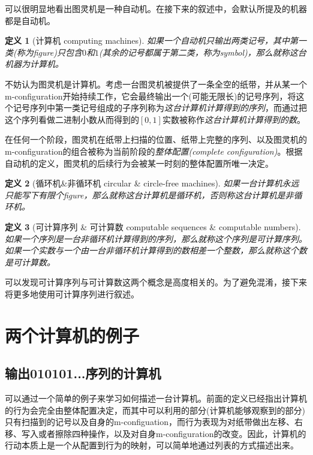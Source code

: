 \documentclass[8pt]{article}
\newtheorem{definition}{定义}
\begin{document}
可以很明显地看出图灵机是一种自动机。在接下来的叙述中，会默认所提及的机器都是自动机。

\begin{definition}[计算机 computing machines]
	如果一个自动机只输出两类记号，其中第一类(称为figure)只包含$0$和$1$(其余的记号都属于第二类，称为symbol)，那么就称这台机器为计算机。
\end{definition}

不妨认为图灵机是计算机。考虑一台图灵机被提供了一条全空的纸带，并从某一个m-configuration开始持续工作，它会最终输出一个(可能无限长)的记号序列，将这个记号序列中第一类记号组成的子序列称为\textit{这台计算机计算得到的序列}，而通过把这个序列看做二进制小数从而得到的$[0, 1]$实数被称作\textit{这台计算机计算得到的数}。

在任何一个阶段，图灵机在纸带上扫描的位置、纸带上完整的序列、以及图灵机的m-configuration的组合被称为当前阶段的\textit{整体配置(complete configuration)}。根据自动机的定义，图灵机的后续行为会被某一时刻的整体配置所唯一决定。

\begin{definition}[循环机\&非循环机 circular \& circle-free machines]
	如果一台计算机永远只能写下有限个figure，那么就称这台计算机是循环机，否则称这台计算机是非循环机。
\end{definition}
\begin{definition}[可计算序列 \& 可计算数 computable sequences \& computable numbers]
	如果一个序列是一台非循环机计算得到的序列，那么就称这个序列是可计算序列。如果一个实数与一个由一台非循环机计算得到的数相差一个整数，那么就称这个数是可计算数。
\end{definition}

可以发现可计算序列与可计算数这两个概念是高度相关的。为了避免混淆，接下来将更多地使用可计算序列进行叙述。

\section{两个计算机的例子}
\subsection{输出010101...序列的计算机}\label{3-1}
可以通过一个简单的例子来学习如何描述一台计算机。前面的定义已经指出计算机的行为会完全由整体配置决定，而其中可以利用的部分(计算机能够观察到的部分)只有扫描到的记号以及自身的m-configuation，而行为表现为对纸带做出左移、右移、写入或者擦除四种操作，以及对自身m-configuration的改变。因此，计算机的行动本质上是一个从配置到行为的映射，可以简单地通过列表的方式描述出来。
\end{document}
